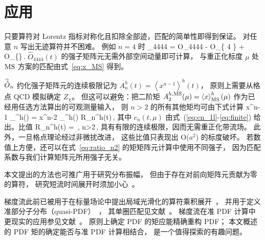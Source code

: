 \section{应用}
只要算符对 Lorentz 指标对称化且扣除全部迹，匹配的简单性即得到保证。
对任意 $n$ 写出无迹算符并不困难。
例如 $n=4$ 时
\be
{}_{4444} = O_{4444} - O_{\left\{\alpha {} 4 \right\}}
+  O_{\left\{\alpha \alpha \beta \beta \right\}}\,.
\ee
$\widehat{O}_{4444}(t)$ 的强子矩阵元无需外部空间动量即可计算，
与重正化标度 $\mu$ 处 $\text{MS}$ 方案的匹配由式~\eqref{eq:x_MS} 得到。

$\widehat{\mathring{O}}_n$ 约化强子矩阵元的连续极限记为
$A_n^h(t) = \left\langle x^{n-1} \right\rangle^h(t)$，
原则上需要从格点 QCD 模拟确定 $Z_\chi$。
但这可以避免：把二阶矩
$A_2^{h,\text{MS}}(\mu) = \left\langle x \right\rangle_{\text{MS}}^h(\mu)$
作为已经用任选方法算出的可观测量输入，
则 $n>2$ 的所有其他矩均可由下式计算
\be
\left\langle x^{n-1} \right\rangle_{\MS}^h(\mu) =
\left\langle x^{n-2} \right\rangle_{\MS}^h(\mu)
 R_n^h(t)\,,
\label{eq:ratio_n2}
\ee
其中 $c_n(t,\mu)$ 由式~(\ref{eq:cn_1l}-\ref{eq:finite}) 给出。比值
\be
R_n^h(t) = \,,
\qquad n>2\,,
\label{eq:Rn}
\ee
具有有限的连续极限，因而无需重正化带流场。
此外，一旦格点理论经过非微扰改进，
这些比值只表现出 O($a^2$) 的标度破坏。
若数值上方便，还可以在式~\eqref{eq:ratio_n2}
的矩矩阵元计算中使用不同强子，
因为匹配系数与我们计算矩阵元所用强子无关。

本文提出的方法也可推广用于研究分布振幅，
但由于存在对前向矩阵元贡献为零的算符，
研究短流时间展开时须加小心~\cite{Bali:2017ude,RQCD:2019osh}。

梯度流此前已被用于在标量场论中提出局域光滑化的算符乘积展开~\cite{Monahan:2015lha}，
并用于定义准部分子分布（quasi-PDF）~\cite{Monahan:2016bvm}，
其单圈匹配见文献~\cite{Monahan:2017hpu}。
梯度流在准 PDF 计算中更现实的应用参见文献~\cite{HadStruc:2022yaw}。
原则上确定 PDF 的矩应能精确重构 PDF；
本文概述的 PDF 矩的确定能否与准 PDF 计算相结合，
是一个值得探索的有趣问题。
